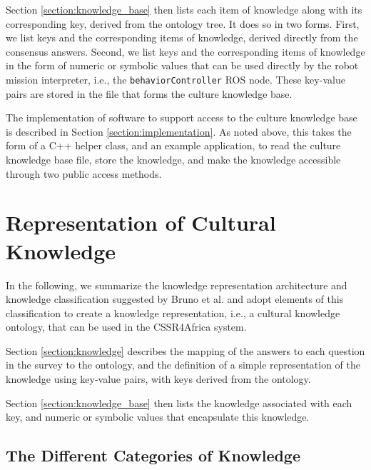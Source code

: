 \documentclass{CSSRforAfrica}
\begin{document}
Section \ref{section:knowledge_base} then lists each item of knowledge along with its corresponding key, derived from the ontology tree. It does so in two forms. First, we list keys and the corresponding items of knowledge, derived directly from the consensus answers. Second,  we list keys and the corresponding items of knowledge in the form of numeric or symbolic values that can be used directly by the robot mission interpreter, i.e., the {\small \tt behaviorController} ROS node.  These key-value pairs are stored in the file that forms the culture knowledge base.

The implementation of software to support access to the culture knowledge base is described in Section \ref{section:implementation}. As noted above, this takes the form of a C++ helper class, and an example application, to read the culture knowledge base file, store the knowledge, and make the knowledge accessible through two public access methods. 




\clearpage

\section{Representation of Cultural Knowledge}
\label{section:representation}

In the following, we summarize the knowledge representation architecture and knowledge classification suggested by Bruno et al. \cite{Brunoetal2019} and adopt elements of this classification to create a knowledge representation, i.e., a cultural knowledge ontology,  that can be used in the CSSR4Africa system.  

Section \ref{section:knowledge} describes the mapping of the answers to each question in the survey  to the ontology, and the definition of a simple representation of the knowledge using key-value pairs, with keys derived from the ontology. 

Section \ref{section:knowledge_base} then lists the knowledge associated with each key, and numeric or symbolic values that encapsulate this knowledge.

 

\subsection{The Different Categories of Knowledge }
\label{section:categories}
\end{document}
